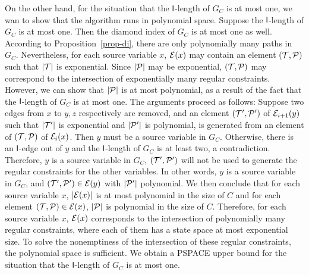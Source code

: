 On the other hand, for the situation that the $\mathsf{l}$-length of $G_C$ is at most one, we wan to show that the algorithm runs in polynomial space. Suppose the $\mathsf{l}$-length of $G_C$ is at most one. Then the diamond index of $G_C$ is at most one as well. According to Proposition~\ref{prop-di}, there are only polynomially many paths in $G_C$. Nevertheless, for each source variable $x$, $\mathcal{E}(x)$ may contain an element $(\mathcal{T},\mathcal{P})$ such that $|\mathcal{T}|$ is exponential. Since $|\mathcal{P}|$ may be exponential, $(\mathcal{T},\mathcal{P})$ may correspond to the intersection of exponentially many regular constraints. However, we can show that $|\mathcal{P}|$ is at most polynomial, as a result of the fact that the $\mathsf{l}$-length of $G_C$ is at most one. The arguments proceed as follows: Suppose two edges from $x$ to $y, z$ respectively are removed, and an element $(\mathcal{T}', \mathcal{P}')$ of $\mathcal{E}_{i+1}(y)$ such that $|\mathcal{T}'|$ is exponential and $|\mathcal{P}'|$ is polynomial, is generated from an element of $(\mathcal{T}, \mathcal{P})$ of $\mathcal{E}_i(x)$. Then $y$ must be a source variable in $G_C$. Otherwise, there is an $\mathsf{l}$-edge out of $y$ and the $\mathsf{l}$-length of $G_C$ is at least two, a contradiction. Therefore, $y$ is a source variable in $G_C$, $(\mathcal{T}', \mathcal{P}')$  will not be used to generate the regular constraints for the other variables. In other words, $y$ is a source variable in $G_C$, and $(\mathcal{T}', \mathcal{P}') \in \mathcal{E}(y)$ with $|\mathcal{P}'|$ polynomial. We then conclude that for each source variable $x$, $|\mathcal{E}(x)|$  is at most polynomial in the size of $C$ and for each element $(\mathcal{T}, \mathcal{P}) \in \mathcal{E}(x)$, $|\mathcal{P}|$ is polynomial in the size of $C$. Therefore, for each source variable $x$,  $\mathcal{E}(x)$ corresponds to the intersection of polynomially many regular constraints, where each of them has a state space at most exponential size. To solve the nonemptiness of the intersection of these regular constraints, the polynomial space is sufficient. We obtain a PSPACE upper bound for the situation that the $\mathsf{l}$-length of $G_C$ is at most one.




